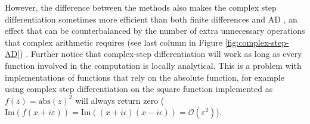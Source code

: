 However, the difference between the methods also makes the complex step differentiation sometimes more efficient than both finite differences and AD \cite{Lantoine_Russell_Dargent_2012}, an effect that can be counterbalanced by the number of extra unnecessary operations that complex arithmetic requires (see last column in Figure \ref{fig:complex-step-AD}) \cite{Martins_Sturdza_Alonso_2003_complex_differentiation}.
Further notice that complex-step differentiation will work as long as every function involved in the computation is locally analytical. 
This is a problem with implementations of functions that rely on the absolute function, for example using complex step differentiation on the square function implemented as $f(z) = \text{abs}(z)^2$ will always return zero ($\text{Im}(f(x + i \varepsilon))= \text{Im}((x + i \epsilon)(x - i \epsilon)) = \mathcal O (\varepsilon^2)$).